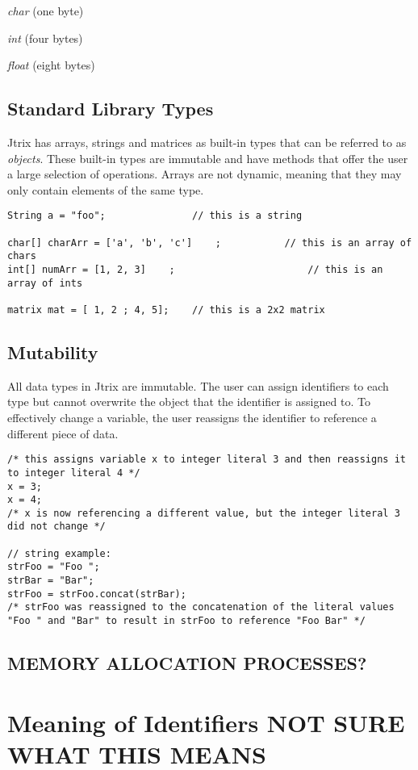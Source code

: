 \documentclass[12pt]{report}
\begin{document}
{\textit{char}  (one byte)

\textit{int}   (four bytes)

\textit{float} (eight bytes)

\section{Standard Library Types}
Jtrix has arrays, strings and matrices as built-in types that can be referred to as \textit{objects}. These built-in types are immutable and have methods that offer the user a large selection of operations. Arrays are not dynamic, meaning that they may only contain elements of the same type.
\begin{lstlisting}
String a = "foo";				// this is a string

char[] charArr = ['a', 'b', 'c']	;			// this is an array of chars
int[] numArr = [1, 2, 3]	;						// this is an array of ints

matrix mat = [ 1, 2 ; 4, 5];	// this is a 2x2 matrix

\end{lstlisting}

\section{Mutability}
All data types in Jtrix are immutable. The user can assign identifiers to each type but cannot overwrite the object that the identifier is assigned to. To effectively change a variable, the user reassigns the identifier to reference a different piece of data.
\begin{lstlisting}
/* this assigns variable x to integer literal 3 and then reassigns it to integer literal 4 */
x = 3;
x = 4;
/* x is now referencing a different value, but the integer literal 3 did not change */

// string example:
strFoo = "Foo ";
strBar = "Bar";
strFoo = strFoo.concat(strBar);
/* strFoo was reassigned to the concatenation of the literal values "Foo " and "Bar" to result in strFoo to reference "Foo Bar" */
\end{lstlisting}

\section{MEMORY ALLOCATION PROCESSES?}


\chapter{Meaning of Identifiers NOT SURE WHAT THIS MEANS}

}
\end{document}

